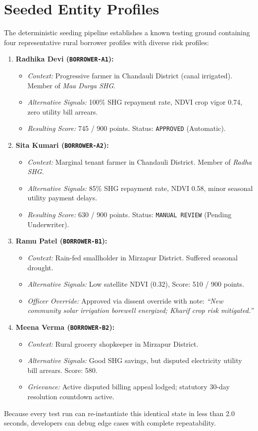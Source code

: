 \section{Seeded Entity Profiles}
The deterministic seeding pipeline establishes a known testing ground containing four representative rural borrower profiles with diverse risk profiles:

\begin{enumerate}
  \item \textbf{Radhika Devi (\texttt{BORROWER-A1}):}
    \begin{itemize}
      \item \textit{Context:} Progressive farmer in Chandauli District (canal irrigated). Member of \textit{Maa Durga SHG}.
      \item \textit{Alternative Signals:} 100\% SHG repayment rate, NDVI crop vigor 0.74, zero utility bill arrears.
      \item \textit{Resulting Score:} 745 / 900 points. Status: \texttt{APPROVED} (Automatic).
    \end{itemize}
  \item \textbf{Sita Kumari (\texttt{BORROWER-A2}):}
    \begin{itemize}
      \item \textit{Context:} Marginal tenant farmer in Chandauli District. Member of \textit{Radha SHG}.
      \item \textit{Alternative Signals:} 85\% SHG repayment rate, NDVI 0.58, minor seasonal utility payment delays.
      \item \textit{Resulting Score:} 630 / 900 points. Status: \texttt{MANUAL REVIEW} (Pending Underwriter).
    \end{itemize}
  \item \textbf{Ramu Patel (\texttt{BORROWER-B1}):}
    \begin{itemize}
      \item \textit{Context:} Rain-fed smallholder in Mirzapur District. Suffered seasonal drought.
      \item \textit{Alternative Signals:} Low satellite NDVI (0.32), Score: 510 / 900 points.
      \item \textit{Officer Override:} Approved via dissent override with note: \textit{``New community solar irrigation borewell energized; Kharif crop risk mitigated.''}
    \end{itemize}
  \item \textbf{Meena Verma (\texttt{BORROWER-B2}):}
    \begin{itemize}
      \item \textit{Context:} Rural grocery shopkeeper in Mirzapur District.
      \item \textit{Alternative Signals:} Good SHG savings, but disputed electricity utility bill arrears. Score: 580.
      \item \textit{Grievance:} Active disputed billing appeal lodged; statutory 30-day resolution countdown active.
    \end{itemize}
\end{enumerate}
Because every test run can re-instantiate this identical state in less than 2.0 seconds, developers can debug edge cases with complete repeatability.
